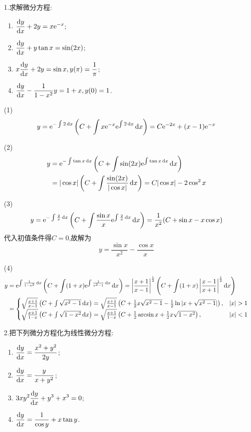 1.求解微分方程:
\begin{enumerate}[(1)]
\item $\displaystyle\frac{\mathop{}\!\mathrm{d} y}{\mathop{}\!\mathrm{d} x}+2y=x\mathrm{e}^{-x}$;
\item $\displaystyle\frac{\mathop{}\!\mathrm{d} y}{\mathop{}\!\mathrm{d} x}+y\tan x=\sin(2x)$;
\item $\displaystyle x\frac{\mathop{}\!\mathrm{d} y}{\mathop{}\!\mathrm{d} x}+2y=\sin x,y(\pi)=\frac{1}{\pi}$;
\item $\displaystyle\frac{\mathop{}\!\mathrm{d} y}{\mathop{}\!\mathrm{d} x}-\frac{1}{1-x^2}y=1+x,y(0)=1$.
\end{enumerate}

\begin{solve}
(1)\[y=\mathrm{e}^{-\int2\mathop{}\!\mathrm{d} x}\left(C+\int x\mathrm{e}^{-x}\mathrm{e}^{\int2\mathop{}\!\mathrm{d} x}\mathop{}\!\mathrm{d} x\right)=C\mathrm{e}^{-2x}+(x-1)\mathrm{e}^{-x}\]

(2)\[\begin{split}
y&=\mathrm{e}^{-\int\tan x\mathop{}\!\mathrm{d} x}\left(C+\int\sin(2x)\mathrm{e}^{\int\tan x\mathop{}\!\mathrm{d} x}\mathop{}\!\mathrm{d} x\right)\\
&=|\cos x|\left(C+\int\frac{\sin(2x)}{|\cos x|}\mathop{}\!\mathrm{d} x\right)=C|\cos x|-2\cos^2x
\end{split}\]

(3)\[y=\mathrm{e}^{-\int\frac{2}{x}\mathop{}\!\mathrm{d} x}\left(C+\int\frac{\sin x}{x}\mathrm{e}^{\int\frac{2}{x}\mathop{}\!\mathrm{d} x}\mathop{}\!\mathrm{d} x\right)=\frac{1}{x^2}(C+\sin x-x\cos x)\]
代入初值条件得$C=0$,故解为
\[y=\frac{\sin x}{x^2}-\frac{\cos x}{x}\]

(4)\[
\begin{split}
y&=\e^{\int\frac{1}{1-x^2}\diff x}\left(C+\int(1+x)\e^{\int\frac{1}{x^2-1}\diff x}\diff x\right)=\left|\frac{x+1}{x-1}\right|^{\frac{1}{2}}\left(C+\int(1+x)\left|\frac{x-1}{x+1}\right|^{\frac{1}{2}}\diff x\right)\\
&=\begin{cases}
\sqrt{\frac{x+1}{x-1}}\left(C+\int\sqrt{x^2-1}\diff x\right)=\sqrt{\frac{x+1}{x-1}}\left(C+\frac{1}{2}x\sqrt{x^2-1}-\frac{1}{2}\ln|x+\sqrt{x^2-1}|\right),&|x|>1\\
\sqrt{\frac{x+1}{1-x}}\left(C+\int\sqrt{1-x^2}\diff x\right)=\sqrt{\frac{x+1}{1-x}}\left(C+\frac{1}{2}\arcsin x+\frac{1}{2}x\sqrt{1-x^2}\right),&|x|<1
\end{cases}
\end{split}\]
\end{solve}


2.把下列微分方程化为线性微分方程:
\begin{enumerate}[(1)]
\item $\displaystyle\frac{\mathop{}\!\mathrm{d} y}{\mathop{}\!\mathrm{d} x}=\frac{x^2+y^2}{2y}$;
\item $\displaystyle\frac{\mathop{}\!\mathrm{d} y}{\mathop{}\!\mathrm{d} x}=\frac{y}{x+y^2}$;
\item $\displaystyle 3xy^2\frac{\mathop{}\!\mathrm{d} y}{\mathop{}\!\mathrm{d} x}+y^3+x^3=0$;
\item $\displaystyle\frac{\mathop{}\!\mathrm{d} y}{\mathop{}\!\mathrm{d} x}=\frac{1}{\cos y}+x\tan y$.
\end{enumerate}

